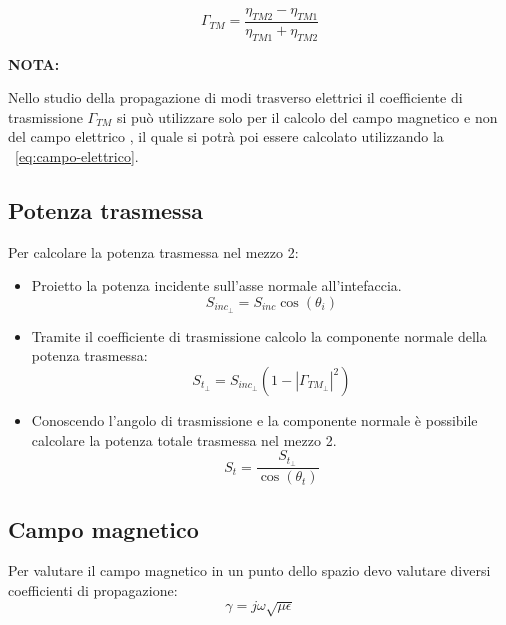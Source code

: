 \documentclass[10pt,a4paper]{report}
\begin{document}
			\begin{equation}
			\Gamma_{TM}=\frac{\eta_{TM2}-\eta_{TM1}}{\eta_{TM1}+\eta_{TM2}}
			\end{equation}
		
			 
			 \textbf{ NOTA: }
			 
			 Nello studio della propagazione di modi trasverso elettrici il coefficiente di trasmissione $\Gamma_{TM}$ si può utilizzare solo per il calcolo del campo magnetico e non del campo elettrico , il quale si potrà poi essere calcolato utilizzando la ~\ref{eq:campo-elettrico}.

		\subsection{Potenza trasmessa}

			Per calcolare la potenza trasmessa nel mezzo 2:
			
			\begin{itemize}
			
			\item Proietto la potenza incidente sull'asse normale all'intefaccia.
			\begin{equation}
			S_{inc_\perp}=S_{inc}\cos(\theta_i)
			\end{equation}

			\item Tramite il coefficiente di trasmissione calcolo la componente normale della potenza trasmessa:
			\begin{equation}
			S_{t_\perp}=S_{inc_\perp}(1-|\Gamma_{TM_\perp}|^2)
			\end{equation}

			\item Conoscendo l'angolo di trasmissione e la componente normale è possibile calcolare la potenza totale trasmessa nel mezzo 2.
			\begin{equation}
			S_{t}=\frac{S_{t_\perp}}{\cos(\theta_t)}
			\end{equation}
			

			\end{itemize}
		

		\subsection{Campo magnetico}

			Per valutare il campo magnetico in un punto dello spazio devo valutare diversi coefficienti di propagazione:
			\begin{equation}
			\gamma=j\omega\sqrt{\mu\epsilon}\end{equation}
\end{document}
